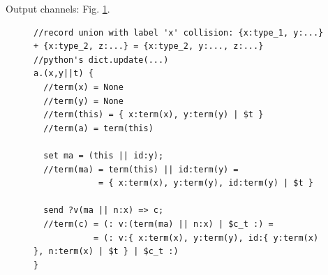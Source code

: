 Output channels: Fig. \ref{b}.
\begin{figure}[h!]
\begin{lstlisting}[frame=single]
//record union with label 'x' collision: {x:type_1, y:...} + {x:type_2, z:...} = {x:type_2, y:..., z:...}
//python's dict.update(...)
a.(x,y||t) {
  //term(x) = None
  //term(y) = None
  //term(this) = { x:term(x), y:term(y) | $t }
  //term(a) = term(this)

  set ma = (this || id:y);
  //term(ma) = term(this) || id:term(y) =
             = { x:term(x), y:term(y), id:term(y) | $t }

  send ?v(ma || n:x) => c;
  //term(c) = (: v:(term(ma) || n:x) | $c_t :) =
            = (: v:{ x:term(x), y:term(y), id:{ y:term(x) }, n:term(x) | $t } | $c_t :)
}
\end{lstlisting}
\label{b}
\end{figure}
